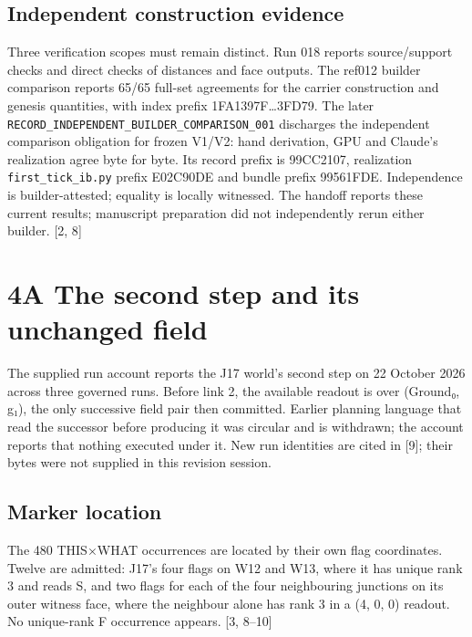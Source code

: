 \documentclass[
]{article}
\begin{document}
\subsection{Independent construction
evidence}\label{independent-construction-evidence}

Three verification scopes must remain distinct. Run 018 reports
source/support checks and direct checks of distances and face outputs.
The ref012 builder comparison reports 65/65 full-set agreements for the
carrier construction and genesis quantities, with index prefix
1FA1397F\ldots3FD79. The later
\nolinkurl{RECORD_INDEPENDENT_BUILDER_COMPARISON_001} discharges the
independent comparison obligation for frozen V1/V2: hand derivation, GPU
and Claude's realization agree byte for byte. Its record prefix is
99CC2107, realization \nolinkurl{first_tick_ib.py} prefix E02C90DE and
bundle prefix 99561FDE. Independence is builder-attested; equality is
locally witnessed. The handoff reports these current results; manuscript
preparation did not independently rerun either builder. {[}2, 8{]}

\section{4A The second step and its unchanged
field}\label{a-the-second-step-and-its-unchanged-field}

The supplied run account reports the J17 world's second step on 22
October 2026 across three governed runs. Before link 2, the available
readout is over (Ground₀, g₁), the only successive field pair then
committed. Earlier planning language that read the successor before
producing it was circular and is withdrawn; the account reports that
nothing executed under it. New run identities are cited in {[}9{]};
their bytes were not supplied in this revision session.

\subsection{Marker location}\label{marker-location}

The 480 THIS×WHAT occurrences are located by their own flag coordinates.
Twelve are admitted: J17's four flags on W12 and W13, where it has
unique rank 3 and reads S, and two flags for each of the four
neighbouring junctions on its outer witness face, where the neighbour
alone has rank 3 in a (4, 0, 0) readout. No unique-rank F occurrence
appears. {[}3, 8--10{]}
\end{document}
